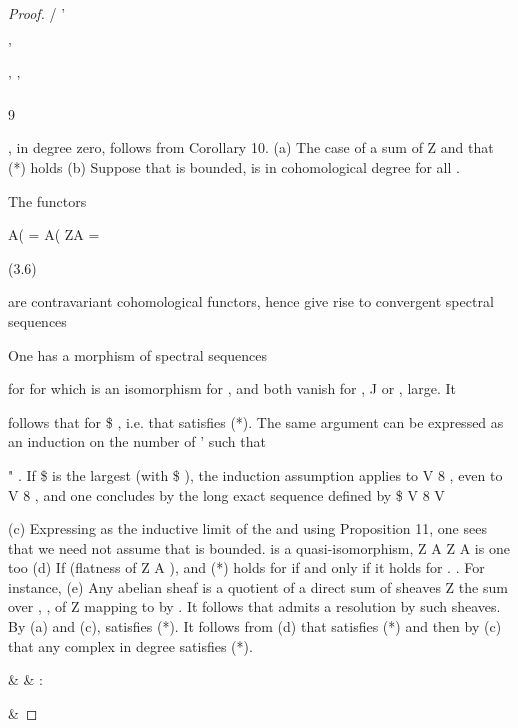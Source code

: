 \documentclass[11pt,a4paper]{article}
\theoremstyle{plain}
\theoremstyle{definition}
\begin{document}
\begin{proof}
/
 '



'

' '




9  





, in degree zero, follows from Corollary 10.
(a) The case of a sum of Z
and that (*) holds
(b) Suppose that is bounded, is in cohomological degree
for all  .



The functors



 A(  =
 A(  ZA  =

(3.6)



are contravariant cohomological functors, hence give rise to convergent spectral
sequences



      

One has a morphism of spectral sequences

for   for  
which is an isomorphism for 
, and both   vanish for , J  or , large. It
  

follows that  
  for \$ , i.e. that satisfies (*).
The same argument can be expressed as an induction on the number of ' such that

" . If \$ is the largest (with \$ ), the induction assumption applies to V 8 ,
even to V 8 , and one concludes by the long exact sequence defined by
 \$
V 8 
V

(c) Expressing as the inductive limit of the  and using Proposition 11, one
sees that we need not assume that is bounded.
 is a quasi-isomorphism,   Z A
  Z A is one too
(d) If 
(flatness of Z A ), and (*) holds for  if and only if it holds for  .
. For instance,
(e) Any abelian sheaf is a quotient of a direct sum of sheaves Z
the sum over
, 
, of Z
mapping to by . It follows that
admits a resolution
by such sheaves. By (a) and (c),
satisfies (*).
It follows from (d) that
satisfies (*) and then by (c) that any complex in
degree
satisfies (*).


 

 

 \& \& : 

 


\&





\end{proof}
\end{document}
